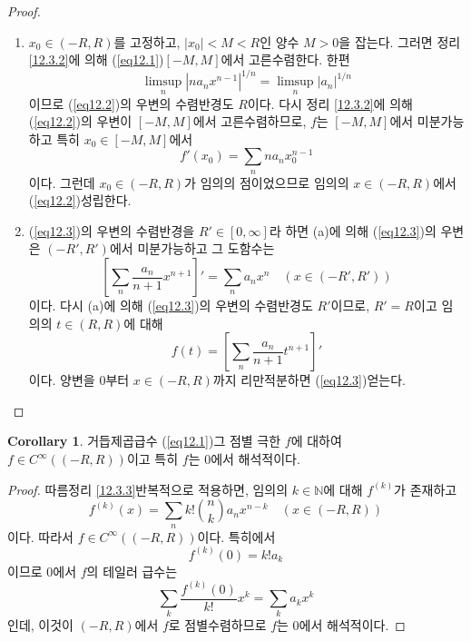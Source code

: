 \documentclass[11pt]{book}
\numberwithin{equation}{chapter}
\def\NN{\mathbb{N}}
\newcommand{\abs}[1]{\left\vert#1\right\vert}
\newcommand{\sqbracket}[1]{\left[#1\right]}
\theoremstyle{definition}
\newtheorem{cor}[thm]{Corollary}
\newenvironment{enum}
	{\begin{enumerate}[label=(\alph*), leftmargin=2\parindent]}
	{\end{enumerate}}
\begin{document}
\begin{proof}
    \quad

    \begin{enum}
        \item \(x_0 \in (-R, R)\)를 고정하고, \(\abs{x_0} < M < R\)인 양수 \(M > 0\)을 잡는다. 그러면 정리 \ref{12.3.2}에 의해 (\ref{eq12.1})\은 \([-M, M]\)에서 고른수렴한다. 한편
        \[
            \limsup_n \abs{n a_n x^{n-1}}^{1/n} = \limsup_n \abs{a_n}^{1/n}
        \]
        이므로 (\ref{eq12.2})의 우변의 수렴반경도 \(R\)이다. 다시 정리 \ref{12.3.2}에 의해 (\ref{eq12.2})의 우변이 \([-M, M]\)에서 고른수렴하므로, \(f\)는 \([-M, M]\)에서 미분가능하고 특히 \(x_0 \in [-M, M]\)에서
        \[
        f'(x_0) = \sum_n na_n x_0^{n-1}    
        \]
        이다. 그런데 \(x_0 \in (-R, R)\)가 임의의 점이었으므로 임의의 \(x \in (-R, R)\)에서 (\ref{eq12.2})\가 성립한다.
        \item (\ref{eq12.3})의 우변의 수렴반경을 \(R' \in [0, \infty]\)라 하면 (a)에 의해 (\ref{eq12.3})의 우변은 \((-R', R')\)에서 미분가능하고 그 도함수는
        \begin{equation} \label{eq12.4}
            \sqbracket{\sum_n \frac{a_n}{n+1}x^{n+1}}' = \sum_n a_n x^n \quad (x \in (-R', R'))
        \end{equation}
        이다. 다시 (a)에 의해 (\ref{eq12.3})의 우변의 수렴반경도 \(R'\)이므로, \(R' = R\)이고 임의의 \(t \in (R, R)\)에 대해
        \[
            f(t) = \sqbracket{\sum_n \frac{a_n}{n+1}t^{n+1}}'
        \]
        이다. 양변을 0부터 \(x \in (-R, R)\)까지 리만적분하면 (\ref{eq12.3})\을 얻는다.
    \end{enum}
\end{proof}

\begin{cor}
    거듭제곱급수 (\ref{eq12.1})\과 그 점별 극한 \(f\)에 대하여 \(f \in C^\infty((-R, R))\)이고 특히 \(f\)는 0에서 해석적이다.
\end{cor}
\begin{proof}
    따름정리 \ref{12.3.3}\을 반복적으로 적용하면, 임의의 \(k \in \NN\)에 대해 \(f^{(k)}\)가 존재하고
    \[
    f^{(k)}(x) = \sum_n k! \binom{n}{k} a_n x^{n-k} \quad (x \in (-R, R))
    \]
    이다. 따라서 \(f \in C^\infty((-R, R))\)이다. 특히에서
    \[
    f^{(k)}(0) = k! a_k   
    \]
    이므로 0에서 \(f\)의 테일러 급수는
    \[
    \sum_k \frac{f^{(k)}(0)}{k!} x^k = \sum_k a_k x^k    
    \]
    인데, 이것이 \((-R, R)\)에서 \(f\)로 점별수렴하므로 \(f\)는 0에서 해석적이다.
\end{proof}
\end{document}

